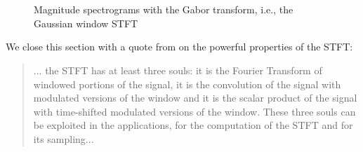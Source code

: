 \documentclass[report.tex]{subfiles}
\begin{document}
\begin{figure}[ht]
	\centering
	\\
	\\
	\caption{Magnitude spectrograms with the Gabor transform, i.e., the Gaussian window STFT}
	\label{fig:stfts2}
\end{figure}

We close this section with a quote from \citeauthor{doerflersouls} on the powerful properties of the STFT:

\begin{quote}
	... the STFT has at least three souls: it is the Fourier Transform of windowed portions of the signal, it is the convolution of the signal with modulated versions of the window and it is the scalar product of the signal with time-shifted modulated versions of the window. These three souls can be exploited in the applications, for the computation of the STFT and for its sampling... \parencite[96]{doerflersouls}
\end{quote}
\end{document}
